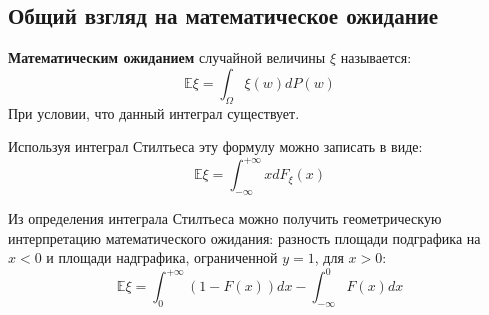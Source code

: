 \subsection{Общий взгляд на математическое ожидание}

\begin{definition}
    \textbf{Математическим ожиданием} случайной величины \(\xi\) называется:
    \begin{equation}
        \mathbb{E}\xi = \int_\Omega \xi(w) dP(w)
        \label{матожидание лебега}
    \end{equation}
    При условии, что данный интеграл существует.
\end{definition}

\begin{remark}
    Используя интеграл Стилтьеса эту формулу можно записать в виде:
    \begin{equation}
        \mathbb{E}\xi = \int_{ -\infty}^{+\infty} x dF_\xi(x)
        \label{матожидание стильтеса}
    \end{equation}

    Из определения интеграла Стилтьеса можно получить геометрическую интерпретацию математического ожидания: разность площади подграфика на \(x < 0\) и площади надграфика, ограниченной \(y = 1\), для \(x > 0\):
    \[\mathbb{E}\xi = \int_0^{+\infty} (1 - F(x)) dx - \int_{-\infty}^0 F(x)dx\]
\end{remark}

